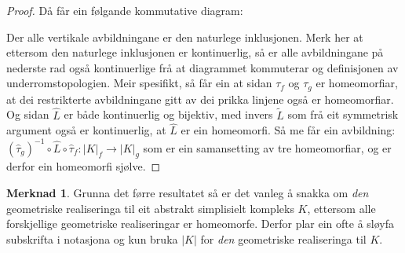 \documentclass[a4paper, 12pt, norsk]{article}
\theoremstyle{plain}
\theoremstyle{definition}
\newtheorem{remark}[theorem]{Merknad}
\newcommand{\Rb}{\mathbb{R}}
\newcommand{\gr}[1]{ \lvert #1 \rvert } %
\begin{document}
\begin{proof}
	Då får ein følgande kommutative diagram:
	\begin{center} %
	\end{center}
	Der alle vertikale avbildningane er den naturlege inklusjonen.
	Merk her at ettersom den naturlege inklusjonen er kontinuerlig, så er alle avbildningane på nederste rad også kontinuerlige frå at diagrammet kommuterar og definisjonen av underromstopologien. Meir spesifikt, så får ein at sidan $\tau_f$ og $\tau_g$ er homeomorfiar, at dei restrikterte avbildningane gitt av dei prikka linjene også er homeomorfiar.
	Og sidan $\hat{L}$ er både kontinuerlig og bijektiv, med invers $\tilde{L}$ som frå eit symmetrisk argument også er kontinuerlig, at $\hat{L}$ er ein homeomorfi.
	Så me får ein avbildning: $(\hat{\tau}_g)^{-1}\circ\hat{L}\circ\hat{\tau}_f:\gr{K}_f\to\gr{K}_g$ som er ein samansetting av tre homeomorfiar, og er derfor ein homeomorfi sjølve.
\end{proof}

\begin{remark}
	Grunna det førre resultatet så er det vanleg å snakka om \emph{den} geometriske realiseringa til eit abstrakt simplisielt kompleks $K$, ettersom alle forskjellige geometriske realiseringar er homeomorfe. Derfor plar ein ofte å sløyfa subskrifta i notasjona og kun bruka $\gr{K}$ for \emph{den} geometriske realiseringa til $K$.
\end{remark}
\end{document}
